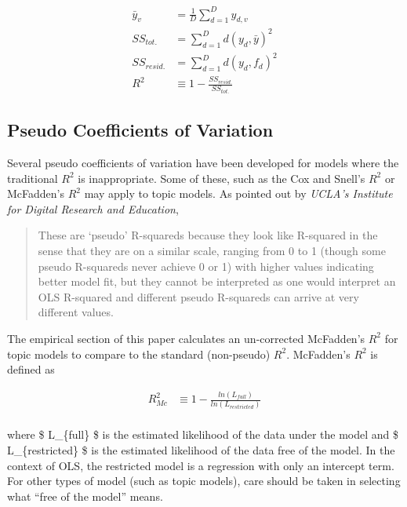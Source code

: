 \documentclass[conference,final,]{IEEEtran}
\begin{document}
\begin{align}
    \bar{y}_v &= \frac{1}{D}\sum_{d=1}^{D}y_{d,v}\\
    SS_{tot.} &= \sum_{d=1}^D{d(y_d, \bar{y})^2}\\
    SS_{resid.} &= \sum_{d=1}^D{d(y_d, f_d)^2}\\
    R^2 &\equiv 1 - \frac{SS_{resid.}}{SS_{tot.} }
\end{align}

\hypertarget{pseudo-coefficients-of-variation}{%
\subsection{Pseudo Coefficients of
Variation}\label{pseudo-coefficients-of-variation}}

Several pseudo coefficients of variation have been developed for models
where the traditional \(R^2\) is inappropriate. Some of these, such as
the Cox and Snell's \(R^2\) \cite{cox89} or McFadden's \(R^2\)
\cite{mcfadden77} may apply to topic models. As pointed out by
\emph{UCLA's Institute for Digital Research and Education},\cite{ucla}

\begin{quote}
These are `pseudo' R-squareds because they look like R-squared in the sense that they are on a similar scale, ranging from 0 to 1 (though some pseudo R-squareds never achieve 0 or 1) with higher values indicating better model fit, but they cannot be interpreted as one would interpret an OLS R-squared and different pseudo R-squareds can arrive at very different values. 
\end{quote}

The empirical section of this paper calculates an un-corrected
McFadden's \(R^2\) for topic models to compare to the standard
(non-pseudo) \(R^2\). McFadden's \(R^2\) is defined as

\begin{align}
    R^2_{Mc} & \equiv 1 - \frac{ ln( L_{full} ) }{ ln( L_{restricted} ) }\\
\end{align}

where \$ L\_\{full\} \$ is the estimated likelihood of the data under
the model and \$ L\_\{restricted\} \$ is the estimated likelihood of the
data free of the model. In the context of OLS, the restricted model is a
regression with only an intercept term. For other types of model (such
as topic models), care should be taken in selecting what ``free of the
model'' means.
\end{document}
